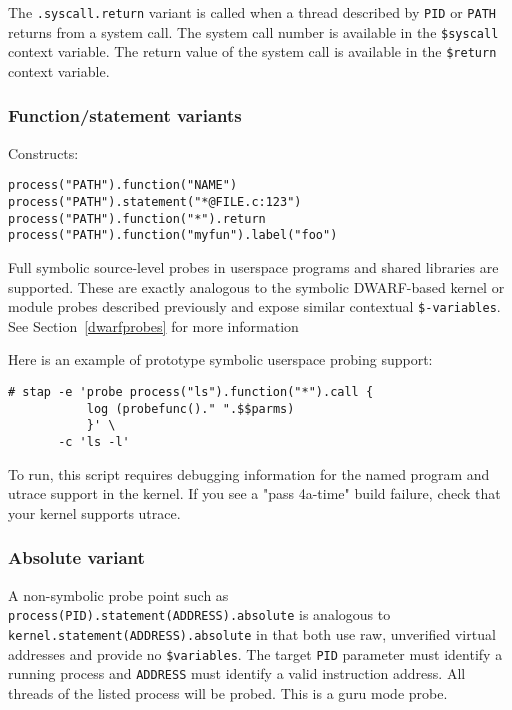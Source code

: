 \documentclass[twoside,english]{article}
\newenvironment{vindent}
{\begin{list}{}{\setlength{\listparindent}{6pt}}
\item[]}
{\end{list}}
\begin{document}
The \texttt{.syscall.return} variant is called when a thread described
by \texttt{PID} or \texttt{PATH} returns from a system call.  The
system call number is available in the \texttt{\$syscall} context
variable.  The return value of the system call is available in the
\texttt{\$return} context variable.


\subsubsection{Function/statement variants}
\label{sec:function-statement}
Constructs:
\begin{vindent}
\begin{verbatim}
process("PATH").function("NAME")
process("PATH").statement("*@FILE.c:123")
process("PATH").function("*").return
process("PATH").function("myfun").label("foo")
\end{verbatim}
\end{vindent}

Full symbolic source-level probes in userspace programs and shared
libraries are supported.  These are exactly analogous to the symbolic
DWARF-based kernel or module probes described previously and expose
similar contextual \texttt{\$-variables}. See
Section~\ref{dwarfprobes} for more information

Here is an example of prototype symbolic userspace probing support:
\begin{vindent}
\begin{verbatim}
# stap -e 'probe process("ls").function("*").call {
           log (probefunc()." ".$$parms)
           }' \
       -c 'ls -l'
\end{verbatim}
\end{vindent}

To run, this script requires debugging information for the named
program and utrace support in the kernel. If you see a "pass 4a-time"
build failure, check that your kernel supports utrace.

\subsubsection{Absolute variant}
\label{sec:absolutevariant}
A non-symbolic probe point such as
\texttt{process(PID).statement(ADDRESS).absolute} is analogous to
\newline\texttt{kernel.statement(ADDRESS).absolute} in that both use
raw, unverified virtual addresses and provide no \texttt{\$variables}.
The target \texttt{PID} parameter must identify a running process and
\texttt{ADDRESS} must identify a valid instruction address.  All
threads of the listed process will be probed.  This is a guru mode
probe.
\end{document}
